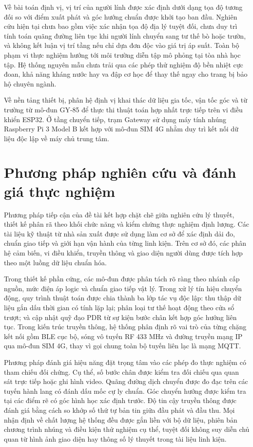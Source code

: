 Về bài toán định vị, vị trí của người lính được xác định dưới dạng tọa độ tương đối so với điểm xuất phát và góc hướng chuẩn được khởi tạo ban đầu. Nghiên cứu hiện tại chưa bao gồm việc xác nhận tọa độ địa lý tuyệt đối, chưa duy trì tính toán quãng đường liên tục khi người lính chuyển sang tư thế bò hoặc trườn, và không kết luận vị trí tầng nếu chỉ dựa đơn độc vào giá trị áp suất. Toàn bộ phạm vi thực nghiệm hướng tới môi trường diễn tập mô phỏng tại tòa nhà học tập. Hệ thống nguyên mẫu chưa trải qua các phép thử nghiệm độ bền nhiệt cực đoan, khả năng kháng nước hay va đập cơ học để thay thế ngay cho trang bị bảo hộ chuyên ngành.

Về nền tảng thiết bị, phân hệ định vị khai thác dữ liệu gia tốc, vận tốc góc và từ trường từ mô-đun GY-85 để thực thi thuật toán hợp nhất trực tiếp trên vi điều khiển ESP32. Ở tầng chuyển tiếp, trạm Gateway sử dụng máy tính nhúng Raspberry Pi 3 Model B kết hợp với mô-đun SIM 4G nhằm duy trì kết nối dữ liệu độc lập về máy chủ trung tâm.

\section{Phương pháp nghiên cứu và đánh giá thực nghiệm}
Phương pháp tiếp cận của đề tài kết hợp chặt chẽ giữa nghiên cứu lý thuyết, thiết kế phân rã theo khối chức năng và kiểm chứng thực nghiệm định lượng. Các tài liệu kỹ thuật từ nhà sản xuất được sử dụng làm cơ sở để xác định dải đo, chuẩn giao tiếp và giới hạn vận hành của từng linh kiện. Trên cơ sở đó, các phân hệ cảm biến, vi điều khiển, truyền thông và giao diện người dùng được tích hợp theo một luồng dữ liệu chuẩn hóa.

Trong thiết kế phần cứng, các mô-đun được phân tách rõ ràng theo nhánh cấp nguồn, mức điện áp logic và chuẩn giao tiếp vật lý. Trong xử lý tín hiệu chuyển động, quy trình thuật toán được chia thành ba lớp tác vụ độc lập: thu thập dữ liệu gắn dấu thời gian có tính lặp lại; phân loại tư thế hoạt động theo cửa sổ trượt; và cập nhật quỹ đạo PDR từ sự kiện bước chân kết hợp góc hướng liên tục. Trong kiến trúc truyền thông, hệ thống phân định rõ vai trò của từng chặng kết nối gồm BLE cục bộ, sóng vô tuyến RF 433 MHz và đường truyền mạng IP qua mô-đun SIM 4G, thay vì gọi chung toàn bộ tuyến liên lạc là mạng MQTT.

Phương pháp đánh giá hiệu năng đặt trọng tâm vào các phép đo thực nghiệm có tham chiếu đối chứng. Cụ thể, số bước chân được kiểm tra đối chiếu qua quan sát trực tiếp hoặc ghi hình video. Quãng đường dịch chuyển được đo đạc trên các tuyến hành lang có đánh dấu mốc cự ly chuẩn. Góc chuyển hướng được kiểm tra tại các điểm rẽ có góc hình học xác định trước. Độ tin cậy truyền thông được đánh giá bằng cách so khớp số thứ tự bản tin giữa đầu phát và đầu thu. Mọi nhận định về chất lượng hệ thống đều được gắn liền với bộ dữ liệu, phiên bản chương trình nhúng và điều kiện thử nghiệm cụ thể, tuyệt đối không suy diễn chủ quan từ hình ảnh giao diện hay thông số lý thuyết trong tài liệu linh kiện.

